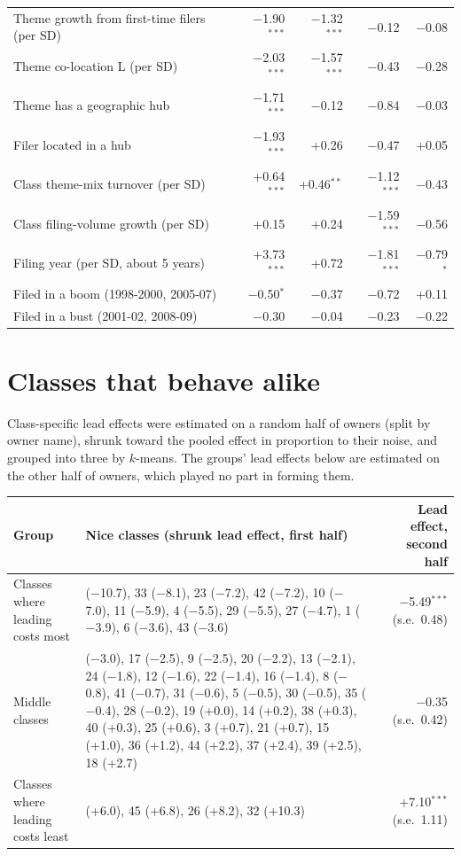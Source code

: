 {\begin{longtable}{>{\raggedright\arraybackslash}p{6.0cm}rrrr}
Theme growth from first-time filers (per SD) & $-$1.90$^{***}$ & $-$1.32$^{***}$ & $-$0.12 & $-$0.08 \\
Theme co-location L (per SD) & $-$2.03$^{***}$ & $-$1.57$^{***}$ & $-$0.43 & $-$0.28 \\
Theme has a geographic hub & $-$1.71$^{***}$ & $-$0.12 & $-$0.84 & $-$0.03 \\
Filer located in a hub & $-$1.93$^{***}$ & +0.26 & $-$0.47 & +0.05 \\
Class theme-mix turnover (per SD) & +0.64$^{***}$ & +0.46$^{**}$ & $-$1.12$^{***}$ & $-$0.43 \\
Class filing-volume growth (per SD) & +0.15 & +0.24 & $-$1.59$^{***}$ & $-$0.56 \\
Filing year (per SD, about 5 years) & +3.73$^{***}$ & +0.72 & $-$1.81$^{***}$ & $-$0.79$^{*}$ \\
Filed in a boom (1998-2000, 2005-07) & $-$0.50$^{*}$ & $-$0.37 & $-$0.72 & +0.11 \\
Filed in a bust (2001-02, 2008-09) & $-$0.30 & $-$0.04 & $-$0.23 & $-$0.22 \\
\bottomrule\end{longtable}}
\section*{Classes that behave alike}
Class-specific lead effects were estimated on a random half of owners (split by owner name), shrunk toward the pooled effect in proportion to their noise, and grouped into three by $k$-means. The groups' lead effects below are estimated on the other half of owners, which played no part in forming them.

{\small\begin{longtable}{>{\raggedright\arraybackslash}p{4.2cm}>{\raggedright\arraybackslash}p{7.0cm}r}
\toprule Group & Nice classes (shrunk lead effect, first half) & Lead effect, second half \\ \midrule \endhead
Classes where leading costs most & 34 ($-$10.7), 33 ($-$8.1), 23 ($-$7.2), 42 ($-$7.2), 10 ($-$7.0), 11 ($-$5.9), 4 ($-$5.5), 29 ($-$5.5), 27 ($-$4.7), 1 ($-$3.9), 6 ($-$3.6), 43 ($-$3.6) & $-$5.49$^{***}$ (s.e.\ 0.48) \\
Middle classes & 7 ($-$3.0), 17 ($-$2.5), 9 ($-$2.5), 20 ($-$2.2), 13 ($-$2.1), 24 ($-$1.8), 12 ($-$1.6), 22 ($-$1.4), 16 ($-$1.4), 8 ($-$0.8), 41 ($-$0.7), 31 ($-$0.6), 5 ($-$0.5), 30 ($-$0.5), 35 ($-$0.4), 28 ($-$0.2), 19 (+0.0), 14 (+0.2), 38 (+0.3), 40 (+0.3), 25 (+0.6), 3 (+0.7), 21 (+0.7), 15 (+1.0), 36 (+1.2), 44 (+2.2), 37 (+2.4), 39 (+2.5), 18 (+2.7) & $-$0.35 (s.e.\ 0.42) \\
Classes where leading costs least & 2 (+6.0), 45 (+6.8), 26 (+8.2), 32 (+10.3) & +7.10$^{***}$ (s.e.\ 1.11) \\
\bottomrule\end{longtable}}
